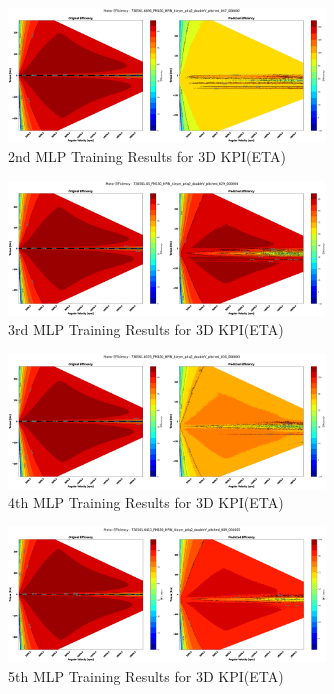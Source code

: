 \documentclass{report} %
\begin{document}
\begin{figure}[h]
    \centering
    \includegraphics[width=0.75\textwidth]{./ReportImages/kpi3dprediction2.png} 
    \caption{2nd MLP Training Results for 3D KPI(ETA)} 
    \label{fig:2nd MLP Training Results for 3D KPI(ETA)}
\end{figure}

\begin{figure}[h]
    \centering
    \includegraphics[width=0.75\textwidth]{./ReportImages/kpi3dprediction3.png} 
    \caption{3rd MLP Training Results for 3D KPI(ETA)} 
    \label{fig:3rd MLP Training Results for 3D KPI(ETA)}
\end{figure}

\begin{figure}[h]
    \centering
    \includegraphics[width=0.75\textwidth]{./ReportImages/kpi3dprediction4.png} 
    \caption{4th MLP Training Results for 3D KPI(ETA)} 
    \label{fig:4th MLP Training Results for 3D KPI(ETA)}
\end{figure}

\begin{figure}[h]
    \centering
    \includegraphics[width=0.75\textwidth]{./ReportImages/kpi3dprediction5.png} 
    \caption{5th MLP Training Results for 3D KPI(ETA)} 
    \label{fig:5th MLP Training Results for 3D KPI(ETA)}
\end{figure}
\end{document}
